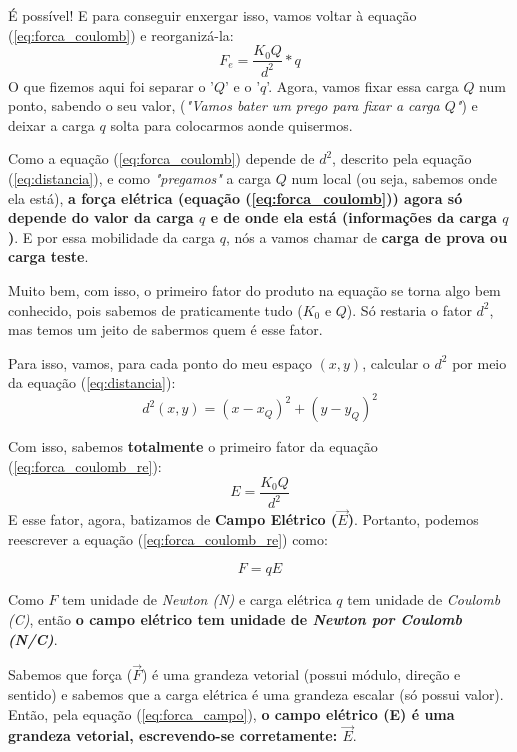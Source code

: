 \documentclass[12pt]{extarticle}
\newcommand{\<}{\langle}
\renewcommand{\>}{\rangle}
\theoremstyle{definition}
\begin{document}
 É possível! E para conseguir enxergar isso, vamos voltar à equação (\ref{eq:forca_coulomb}) e reorganizá-la:
 \begin{equation} \label{eq:forca_coulomb_re}
     F_{e}= \frac{K_{0}Q}{d^{2}}*q
 \end{equation}
O que fizemos aqui foi separar o '$Q$' e o '$q$'. Agora, vamos fixar essa carga $Q$ num ponto, sabendo o seu valor, (\textit{"Vamos bater um prego para fixar a carga $Q$"}) e deixar a carga $q$ solta para colocarmos aonde quisermos. 

Como a equação (\ref{eq:forca_coulomb}) depende de $d^{2}$, descrito pela equação (\ref{eq:distancia}), e como \textit{"pregamos"} a carga $Q$ num local (ou seja, sabemos onde ela está), \textbf{a força elétrica (equação (\ref{eq:forca_coulomb})) agora só depende do valor da carga $q$ e de onde ela está (informações da carga $q$)}. E por essa mobilidade da carga $q$, nós a vamos chamar de \textbf{carga de prova ou carga teste}.

Muito bem, com isso, o primeiro fator do produto na equação se torna algo bem conhecido, pois sabemos de praticamente tudo ($K_{0}$ e $Q$). Só restaria o fator $d^{2}$, mas temos um jeito de sabermos quem é esse fator.

Para isso, vamos, para cada ponto do meu espaço $(x,y)$, calcular o $d^{2}$ por meio da equação (\ref{eq:distancia}):
\begin{equation}
    d^{2}(x,y) = (x-x_{Q})^{2} + (y-y_{Q})^{2}
\end{equation}

Com isso, sabemos \textbf{totalmente} o primeiro fator da equação (\ref{eq:forca_coulomb_re}):
\begin{equation} \label{eq:campo_eletrico}
    E = \frac{K_{0}Q}{d^{2}}
\end{equation}
E esse fator, agora, batizamos de \textbf{Campo Elétrico ($\vec{E}$)}. Portanto, podemos reescrever a equação (\ref{eq:forca_coulomb_re}) como:

\begin{equation} \label{eq:forca_campo}
    F = qE
\end{equation}
 
 Como $F$ tem unidade de \textit{Newton (N)} e carga elétrica $q$ tem unidade de \textit{Coulomb (C)}, então \textbf{o campo elétrico tem unidade de \textit{Newton por Coulomb (N/C)}}.
 
 Sabemos que força ($\vec{F}$) é uma grandeza vetorial (possui módulo, direção e sentido) e sabemos que a carga elétrica é uma grandeza escalar (só possui valor). Então, pela equação (\ref{eq:forca_campo}), \textbf{o campo elétrico (E) é uma grandeza vetorial, escrevendo-se corretamente: $\vec{E}$}.
 
\end{document}
